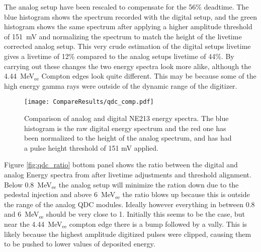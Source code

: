 \documentclass[main.tex]{subfiles}
\begin{document}
The analog setup have been rescaled to compensate for the 56\% deadtime. The blue histogram shows the spectrum recorded with the digital setup, and the green histogram shows the same spectrum after applying a higher amplitude threshold of \SI{151}{mV} and normalizing the spectrum to match the height of the livetime corrected analog setup. This very crude estimation of the digital setups livetime gives a livetime of 12\% compared to the analog setups livetime of 44\%. By carrying out these changes the two energy spectra look more alike, although the \SI{4.44}{\MeV}$_\text{ee}$ Compton edges look quite different. This may be because some of the high energy gamma rays were outside of the dynamic range of the digitizer.

\begin{figure}[h]
    \centering
        \texttt{[image: CompareResults/qdc\_comp.pdf]}
        \caption[Comparison of analog and digital NE213 energy spectra]{Comparison of analog and digital NE213 energy spectra. The blue histogram is the raw digital energy spectrum and the red one has been normalized to the height of the analog spectrum, and has had a pulse height threshold of 151 mV applied.}
    \label{fig:qdc_comp}
\end{figure}

Figure \ref{fig:qdc_ratio} bottom panel shows the ratio between the digital and analog Energy spectra from after livetime adjustments and threshold alignment. Below \SI{0.8}{\MeV}$_\text{ee}$ the analog setup will minimize the ration down due to the pedestal injection and above \SI{6}{\MeV}$_\text{ee}$ the ratio blows up because this is outside the range of the analog QDC modules. Ideally however everything in between 0.8 and \SI{6}{\MeV}$_\text{ee}$ should be very close to 1. Initially this seems to be the case, but near the \SI{4.44}{\MeV}$_\text{ee}$ compton edge there is a bump followed by a vally. This is likely because the highest amplitude digitized pulses were clipped, causing them to be pushed to lower values of deposited energy.
\end{document}
